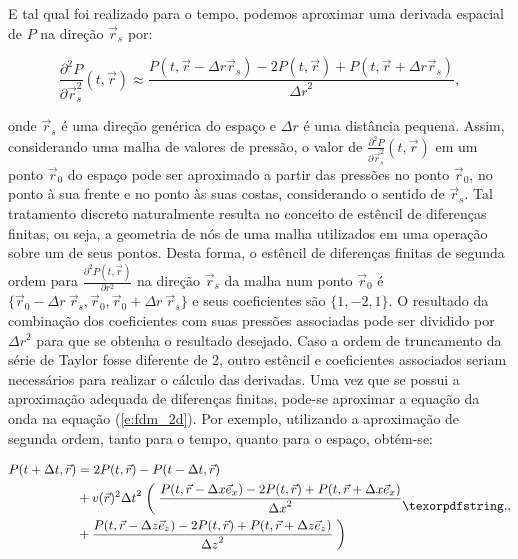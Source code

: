     E tal qual foi realizado para o tempo, podemos aproximar uma derivada espacial de $P$ na direção $\vec{r}_s$ por:

    \begin{equation} \label{e:fdm_h}
      \frac{\partial^2 P}{\partial\vec{r}_s^2} (t, \vec{r}) \approx
      \frac{P(t,\vec{r}-{\Delta r}\vec{r}_s) - 2P(t,\vec{r}) + P(t,\vec{r}+{\Delta r}\vec{r}_s)}{{\Delta r}^2}
      ,
    \end{equation}

    \noindent onde $\vec{r}_s$ é uma direção genérica do espaço e $\Delta r$ é uma distância pequena. Assim, considerando uma malha de valores de pressão, o valor de $\frac{\partial^2 P}{\partial\vec{r}_s^2}(t,\vec{r})$ em um ponto $\vec{r}_0$ do espaço pode ser aproximado a partir das pressões no ponto $\vec{r}_0$, no ponto à sua frente e no ponto às suas costas, considerando o sentido de $\vec{r}_s$. Tal tratamento discreto naturalmente resulta no conceito de estêncil de diferenças finitas, ou seja, a geometria de nós de uma malha utilizados em uma operação sobre um de seus pontos. Desta forma, o estêncil de diferenças finitas de segunda ordem para $\frac{\partial^2 P(t,\vec{r})}{\partial r^2}$ na direção $\vec{r}_s$ da malha num ponto $\vec{r}_0$ é $\{\vec{r}_0 - {\Delta r}\ \vec{r}_s, \vec{r}_0, \vec{r}_0+{\Delta r}\ \vec{r}_s\}$ e seus coeficientes são $\{1, -2, 1\}$. O resultado da combinação dos coeficientes com suas pressões associadas pode ser dividido por $\Delta r^2$ para que se obtenha o resultado desejado. Caso a ordem de truncamento da série de Taylor fosse diferente de 2, outro estêncil e coeficientes associados seriam necessários para realizar o cálculo das derivadas. Uma vez que se possui a aproximação adequada de diferenças finitas, pode-se aproximar a equação da onda na equação (\ref{e:fdm_2d}). Por exemplo, utilizando a aproximação de segunda ordem, tanto para o tempo, quanto para o espaço, obtém-se:

    \begin{equation} \label{e:fdm_2d_ordem_2}
      \begin{split}
        P(t+\Delta t,\vec{r}) & =  2 P(t,\vec{r}) - P(t-\Delta t,\vec{r}) \\
          & + v(\vec{r})^2 {\Delta t}^2 \biggm( \frac{P(t, \vec{r}-{\Delta x} \vec{e}_x) - 2P(t, \vec{r}) + P(t, \vec{r}+{\Delta x}\vec{e}_x)}{{\Delta x}^2} \\
          & + \frac{P(t,\vec{r}-{\Delta z} \vec{e}_z)-2P(t,\vec{r})+P(t, \vec{r}+{\Delta z} \vec{e}_z)}{{\Delta z}^2} \biggm)
      \end{split}\DIFaddbegin \DIFadd{,  %
    }\DIFaddend \end{equation}


